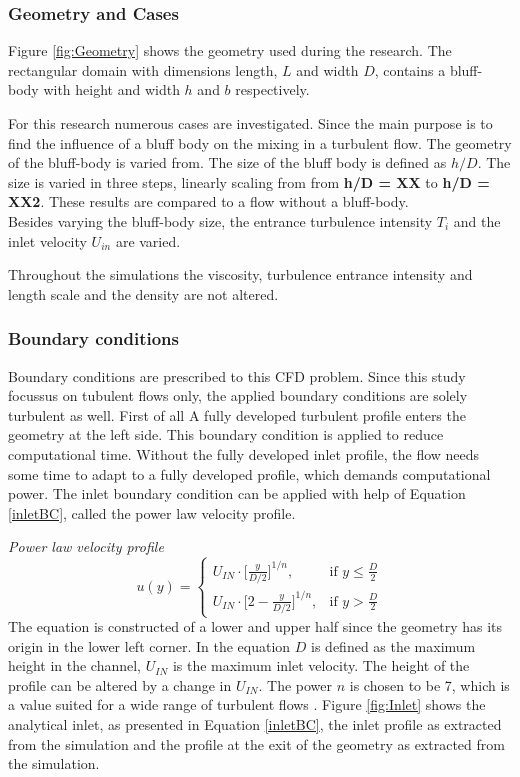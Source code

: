 \documentclass{CFD2017}
\begin{document}
\subsubsection{Geometry and Cases}
Figure \ref{fig:Geometry} shows the geometry used during the research. The rectangular domain with dimensions length, $L$ and width $D$, contains a bluff-body with height and width $h$ and $b$ respectively.


For this research numerous cases are investigated. Since the main purpose is to find the influence of a bluff body on the mixing in a turbulent flow. The geometry of the bluff-body is varied from. The size of the bluff body is defined as $h/D$. The size is varied in three steps, linearly scaling from from \textbf{h/D = XX} to \textbf{h/D = XX2}. These results are compared to a flow without a bluff-body.\\
Besides varying the bluff-body size, the entrance turbulence intensity $T_i$ and the inlet velocity $U_{in}$ are varied. 


Throughout the simulations the viscosity, turbulence entrance intensity and length scale and the density are not altered.


\subsubsection{Boundary conditions}
Boundary conditions are prescribed to this CFD problem. Since this study focussus on tubulent flows only, the applied boundary conditions are solely turbulent as well. First of all A fully developed turbulent profile enters the geometry at the left side. This boundary condition is applied to reduce computational time. Without the fully developed inlet profile, the flow needs some time to adapt to a fully developed profile, which demands computational power. The inlet boundary condition can be applied with help of Equation \ref{inletBC}, called the power law velocity profile. \vspace{2mm}

\emph{Power law velocity profile}
\begin{equation}
\label{inletBC}
u(y) = \begin{cases} U_{IN}\cdot \big[\frac{y}{D/2}\big]^{1/n}, & \mbox{if } y\leq\frac{D}{2} \\ U_{IN}\cdot \big[2-\frac{y}{D/2}\big]^{1/n}, & \mbox{if } y>\frac{D}{2}\end{cases}
\end{equation}
The equation is constructed of a lower and upper half since the geometry has its origin in the lower left corner. In the equation $D$ is defined as the maximum height in the channel, $U_{IN}$ is the maximum inlet velocity. The height of the profile can be altered by a change in $U_{IN}$. The power $n$ is chosen to be 7, which is a value suited for a wide range of turbulent flows \cite{Morrison}. Figure \ref{fig:Inlet} shows the analytical inlet, as presented in Equation \ref{inletBC}, the inlet profile as extracted from the simulation and the profile at the exit of the geometry as extracted from the simulation.
\end{document}
